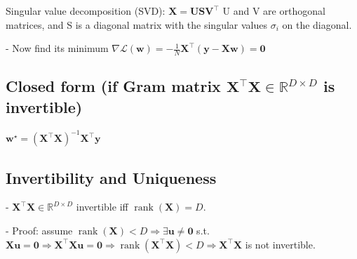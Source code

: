 Singular value decomposition (SVD):
$
\mathbf{X}=\mathbf{US}\mathbf{V}^\top 
$
U and V are orthogonal matrices, and S is a diagonal matrix with the singular values $\sigma_i$ on the diagonal.




- Now find its minimum
$
\nabla \mathcal{L}(\mathbf{w})=-\frac{1}{N} \mathbf{X}^{\top}(\mathbf{y}-\mathbf{X} \mathbf{w}) = \mathbf{0}
$




\subsection*{Closed form (if Gram matrix $\mathbf{X}^{\top} \mathbf{X} \in \mathbb{R}^{D \times D}$ is invertible)}
$
\mathbf{w}^{\star}=(\mathbf{X}^{\top} \mathbf{X})^{-1} \mathbf{X}^{\top} \mathbf{y}
$

\subsection*{Invertibility and Uniqueness}
- $\mathbf{X}^{\top} \mathbf{X} \in \mathbb{R}^{D \times D}$ invertible iff $\operatorname{rank}(\mathbf{X})=D$.

- Proof: assume $\operatorname{rank}(\mathbf{X})<D \Rightarrow \exists\mathbf{u} \neq \mathbf{0}$ s.t. $\mathbf{X u}=\mathbf{0} \Rightarrow\mathbf{X}^{\top} \mathbf{X u}=\mathbf{0}\Rightarrow\operatorname{rank}(\mathbf{X}^{\top} \mathbf{X})<D\Rightarrow\mathbf{X}^{\top} \mathbf{X}$ is not invertible.


